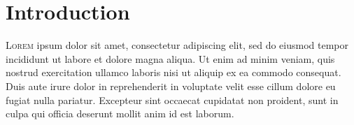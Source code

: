 

\chapter{Introduction}



\lettrine{L}{orem} ipsum dolor sit amet, consectetur
adipiscing elit, sed do eiusmod tempor incididunt ut labore et dolore magna
aliqua. Ut enim ad minim veniam, quis nostrud exercitation ullamco laboris nisi
ut aliquip ex ea commodo consequat. Duis aute irure dolor in reprehenderit in
voluptate velit esse cillum dolore eu fugiat nulla pariatur. Excepteur sint
occaecat cupidatat non proident, sunt in culpa qui officia deserunt mollit anim
id est laborum.


\doclicenseFullText